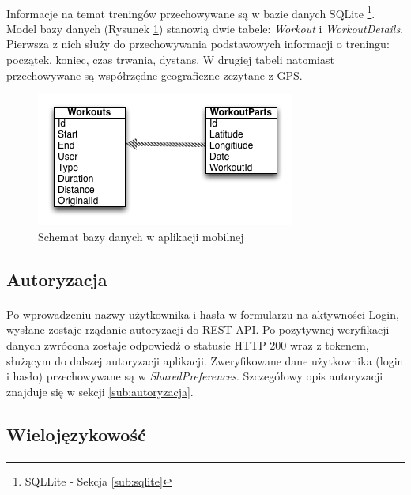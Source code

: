 \paragraph{} %
\label{par:}

Informacje na temat treningów przechowywane są w bazie danych SQLite \footnote{SQLLite - Sekcja \ref{sub:sqlite}}. Model bazy danych (Rysunek \ref{fig:sqlite-model}) stanowią dwie tabele: \textit{Workout} i \textit{WorkoutDetails}. Pierwsza z nich służy do przechowywania podstawowych informacji o treningu: początek, koniec, czas trwania, dystans. W drugiej tabeli natomiast przechowywane są współrzędne geograficzne zczytane z GPS.
\begin{figure}[ht]
	\centering
		\includegraphics[width=0.6\linewidth]{assets/sql_schema.png}
		\caption{Schemat bazy danych w aplikacji mobilnej}
	\label{fig:sqlite-model}
\end{figure}

\subsection{Autoryzacja} %
\label{sub:}
\paragraph{} %
\label{par:}
Po wprowadzeniu nazwy użytkownika i hasła w formularzu na aktywności Login, wysłane zostaje rządanie autoryzacji do REST API. Po pozytywnej weryfikacji danych zwrócona zostaje odpowiedź o statusie HTTP 200 wraz z tokenem, służącym do dalszej autoryzacji aplikacji. Zweryfikowane dane użytkownika (login i hasło) przechowywane są w \textit{SharedPreferences}. Szczegółowy opis autoryzacji znajduje się w sekcji \ref{sub:autoryzacja}.

\subsection{Wielojęzykowość} %
\label{sub:wieloj_zykow_}
\paragraph{} %
\label{par:}

